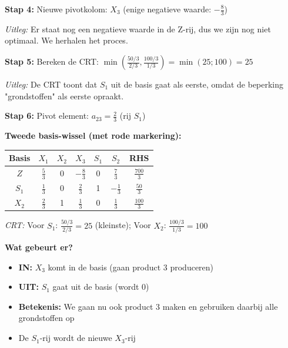 \documentclass[a4paper,11pt]{article}
\begin{document}
\begin{oefenblok}
    \textbf{Stap 4:} Nieuwe pivotkolom: $X_3$ (enige negatieve waarde: $-\frac{8}{3}$)

    \textit{Uitleg:} Er staat nog een negatieve waarde in de Z-rij, dus we zijn nog niet optimaal. We herhalen het proces.

    \textbf{Stap 5:} Bereken de CRT: $\min\left(\frac{50/3}{2/3}, \frac{100/3}{1/3}\right) = \min(25; 100) = 25$

    \textit{Uitleg:} De CRT toont dat $S_1$ uit de basis gaat als eerste, omdat de beperking "grondstoffen" als eerste opraakt.

    \textbf{Stap 6:} Pivot element: $a_{23} = \frac{2}{3}$ (rij $S_1$)

    \textbf{Tweede basis-wissel (met rode markering):}

    \begin{center}
        \begin{tabular}{c|ccccc|c}
            \hline
            Basis & $X_1$         & $X_2$ & $X_3$                            & $S_1$ & $S_2$          & RHS             \\
            \hline
            $Z$   & $\frac{5}{3}$ & 0     & \cellcolor{red!20}$-\frac{8}{3}$ & 0     & $\frac{7}{3}$  & $\frac{700}{3}$ \\
            \rowcolor{red!20}
            $S_1$ & $\frac{1}{3}$ & 0     & \textbf{$\frac{2}{3}$}           & 1     & $-\frac{1}{3}$ & $\frac{50}{3}$  \\
            $X_2$ & $\frac{2}{3}$ & 1     & \cellcolor{red!20}$\frac{1}{3}$  & 0     & $\frac{1}{3}$  & $\frac{100}{3}$ \\
            \hline
        \end{tabular}
    \end{center}

    \textit{CRT:} Voor $S_1$: $\frac{50/3}{2/3} = 25$ (kleinste); Voor $X_2$: $\frac{100/3}{1/3} = 100$

    \textbf{Wat gebeurt er?}
    \begin{itemize}
        \item \textbf{IN:} $X_3$ komt in de basis (gaan product 3 produceren)
        \item \textbf{UIT:} $S_1$ gaat uit de basis (wordt 0)
        \item \textbf{Betekenis:} We gaan nu ook product 3 maken en gebruiken daarbij alle grondstoffen op
        \item De $S_1$-rij wordt de nieuwe $X_3$-rij
    \end{itemize}


\end{oefenblok}
\end{document}
